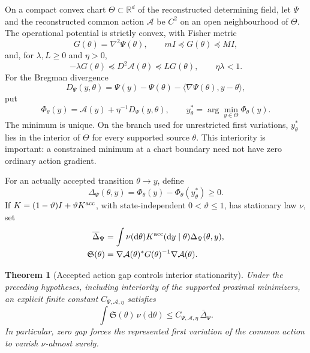 \documentclass[11pt]{article}
\newtheorem{theorem}{Theorem}[section]
\numberwithin{equation}{section}
\theoremstyle{definition}
\theoremstyle{remark}
\newcommand{\R}{\mathbb R}
\newcommand{\dd}{\mathrm d}
\begin{document}
On a compact convex chart $\Theta\subset\R^d$ of the reconstructed determining
field, let $\Psi$ and the reconstructed common action $\mathcal A$ be $C^2$ on
an open neighbourhood of $\Theta$.  The operational potential is strictly
convex, with Fisher metric
\begin{equation}
 G(\theta)=\nabla^2\Psi(\theta),
 \qquad mI\preceq G(\theta)\preceq MI,
 \label{eq:main-fisher-metric}
\end{equation}
and, for $\lambda,L\ge0$ and $\eta>0$,
\begin{equation}
 -\lambda G(\theta)\preceq D^2\mathcal A(\theta)
 \preceq L G(\theta),\qquad \eta\lambda<1.
 \label{eq:main-action-hessian}
\end{equation}
For the Bregman divergence~\cite{Bregman1967}
\begin{equation}
 D_\Psi(y,\theta)=\Psi(y)-\Psi(\theta)
       -\langle\nabla\Psi(\theta),y-\theta\rangle,
 \label{eq:main-bregman}
\end{equation}
put
\begin{equation}
 \Phi_\theta(y)=\mathcal A(y)+\eta^{-1}D_\Psi(y,\theta),
 \qquad y_\theta^*=\arg\min_{y\in\Theta}\Phi_\theta(y).
 \label{eq:main-proximal-action}
\end{equation}
The minimum is unique.  On the branch used for unrestricted first variations,
$y_\theta^*$ lies in the interior of $\Theta$ for every supported source
$\theta$.  This interiority is important: a constrained minimum at a chart
boundary need not have zero ordinary action gradient.

For an actually accepted transition $\theta\to y$, define
\begin{equation}
 \Delta_\Psi(\theta,y)
       =\Phi_\theta(y)-\Phi_\theta(y_\theta^*)\ge0.
 \label{eq:main-action-gap}
\end{equation}
If $K=(1-\vartheta)I+\vartheta K^{\rm acc}$, with state-independent
$0<\vartheta\le1$, has stationary law $\nu$, set
\begin{equation}
 \begin{aligned}
 \overline\Delta_\Psi
  &=\int\nu(\dd\theta)K^{\rm acc}(\dd y\mid\theta)
                          \Delta_\Psi(\theta,y),\\
 \mathfrak S(\theta)
  &=\nabla\mathcal A(\theta)^*G(\theta)^{-1}\nabla\mathcal A(\theta).
 \end{aligned}
 \label{eq:main-stationarity-gap}
\end{equation}

\begin{theorem}[Accepted action gap controls interior stationarity]
\label{thm:main-action-stationarity}
Under the preceding hypotheses, including interiority of the supported
proximal minimizers, an explicit finite constant
$C_{\Psi,\mathcal A,\eta}$ satisfies
\begin{equation}
 \int\mathfrak S(\theta)\,\nu(\dd\theta)
       \le C_{\Psi,\mathcal A,\eta}\,\overline\Delta_\Psi.
 \label{eq:main-stationarity-bound}
\end{equation}
In particular, zero gap forces the represented first variation of the common
action to vanish $\nu$-almost surely.
\end{theorem}
\end{document}
